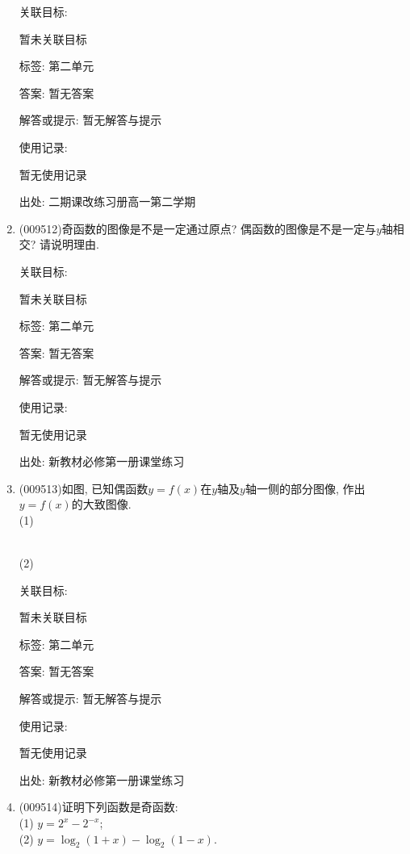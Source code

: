 \documentclass[10pt,a4paper]{article}
\begin{document}
\begin{enumerate}[1.]
关联目标:

暂未关联目标



标签: 第二单元

答案: 暂无答案

解答或提示: 暂无解答与提示

使用记录:

暂无使用记录


出处: 二期课改练习册高一第二学期
\item { (009512)}奇函数的图像是不是一定通过原点? 偶函数的图像是不是一定与$y$轴相交?  请说明理由.


关联目标:

暂未关联目标



标签: 第二单元

答案: 暂无答案

解答或提示: 暂无解答与提示

使用记录:

暂无使用记录


出处: 新教材必修第一册课堂练习
\item { (009513)}如图, 已知偶函数$y=f(x)$在$y$轴及$y$轴一侧的部分图像, 作出$y=f(x)$的大致图像.\\
(1) \\
(2) 


关联目标:

暂未关联目标



标签: 第二单元

答案: 暂无答案

解答或提示: 暂无解答与提示

使用记录:

暂无使用记录


出处: 新教材必修第一册课堂练习
\item { (009514)}证明下列函数是奇函数:\\
(1) $y=2^x-2^{-x}$;\\
(2) $y=\log_2(1+x)-\log_2(1-x)$.



\end{enumerate}
\end{document}

